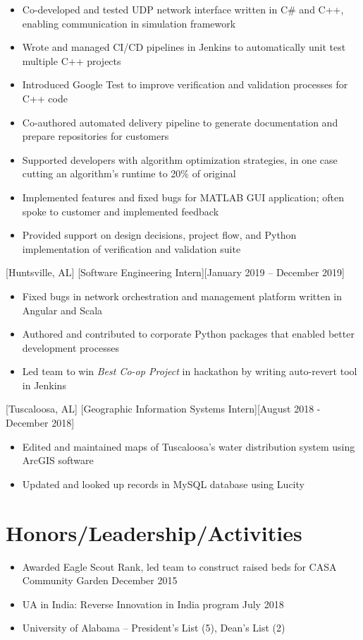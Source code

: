 \documentclass[hidelinks, 11pt]{article}
\begin{document}
\begin{itemize}
	\item Co-developed and tested UDP network interface written in C\# and C++, enabling communication in simulation framework
	\item Wrote and managed CI/CD pipelines in Jenkins to automatically unit test multiple C++ projects
	\item Introduced Google Test to improve verification and validation processes for C++ code
	\item Co-authored automated delivery pipeline to generate documentation and prepare repositories for customers
	\item Supported developers with algorithm optimization strategies, in one case cutting an algorithm's runtime to 20\% of original
	\item Implemented features and fixed bugs for MATLAB GUI application; often spoke to customer and implemented feedback
	\item Provided support on design decisions, project flow, and Python implementation of verification and validation suite
\end{itemize}

[Huntsville, AL]
[Software Engineering Intern][January 2019 -- December 2019]

\begin{itemize}
	\item Fixed bugs in network orchestration and management platform written in Angular and Scala
	\item Authored and contributed to corporate Python packages that enabled better development processes
	\item Led team to win \textit{Best Co-op Project} in hackathon by writing auto-revert tool in Jenkins
\end{itemize}

[Tuscaloosa, AL]
[Geographic Information Systems Intern][August 2018 - December 2018]

\begin{itemize}
	\item Edited and maintained maps of Tuscaloosa’s water distribution system using ArcGIS software
	\item Updated and looked up records in MySQL database using Lucity
\end{itemize}

\section{Honors/Leadership/Activities}

\begin{itemize}
	\item Awarded Eagle Scout Rank, led team to construct raised beds for CASA Community Garden \hfill December 2015
	\item UA in India: Reverse Innovation in India program \hfill July 2018
	\item University of Alabama -- President's List (5), Dean's List (2)
\end{itemize}
\end{document}
